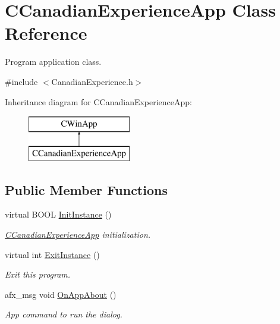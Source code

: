 \hypertarget{class_c_canadian_experience_app}{\section{C\+Canadian\+Experience\+App Class Reference}
\label{class_c_canadian_experience_app}
}


Program application class.  




{\ttfamily \#include $<$Canadian\+Experience.\+h$>$}

Inheritance diagram for C\+Canadian\+Experience\+App\+:\begin{figure}[H]
\begin{center}
\leavevmode
\includegraphics[height=2.000000cm]{class_c_canadian_experience_app}
\end{center}
\end{figure}
\subsection*{Public Member Functions}
\begin{DoxyCompactItemize}
\item 
virtual B\+O\+O\+L \hyperlink{class_c_canadian_experience_app_ab821deed5758f650a2fbbc65cefc8cc7}{Init\+Instance} ()
\begin{DoxyCompactList}\small\item\em \hyperlink{class_c_canadian_experience_app}{C\+Canadian\+Experience\+App} initialization. \end{DoxyCompactList}\item 
virtual int \hyperlink{class_c_canadian_experience_app_a289a9574888e0c922c455e73edf424ad}{Exit\+Instance} ()
\begin{DoxyCompactList}\small\item\em Exit this program. \end{DoxyCompactList}\item 
\hypertarget{class_c_canadian_experience_app_a99cb24a35f65d5821f7e09eefb0c97e7}{afx\+\_\+msg void \hyperlink{class_c_canadian_experience_app_a99cb24a35f65d5821f7e09eefb0c97e7}{On\+App\+About} ()}\label{class_c_canadian_experience_app_a99cb24a35f65d5821f7e09eefb0c97e7}

\begin{DoxyCompactList}\small\item\em App command to run the dialog. \end{DoxyCompactList}\end{DoxyCompactItemize}


